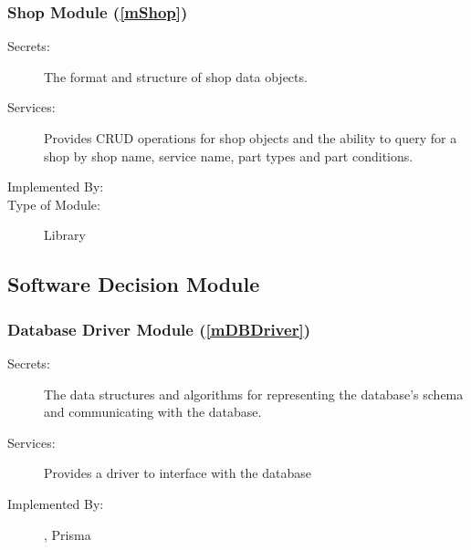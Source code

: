 \documentclass[12pt, titlepage]{article}
\begin{document}
\subsubsection{Shop Module (\ref{mShop})}

\begin{description}
	\item[Secrets:] The format and structure of shop data objects.
	\item[Services:] Provides CRUD operations for shop objects and the ability to query for a shop by shop
		name, service name, part types and part conditions.
	\item[Implemented By:] \progname{}
	\item[Type of Module:] Library
\end{description}

\subsection{Software Decision Module}


\subsubsection{Database Driver Module (\ref{mDBDriver})}
\begin{description}
	\item[Secrets:] The data structures and algorithms for representing the database's schema and
		communicating with the database.
	\item[Services:] Provides a driver to interface with the database
	\item[Implemented By:] \progname{}, Prisma
\end{description}
\end{document}
